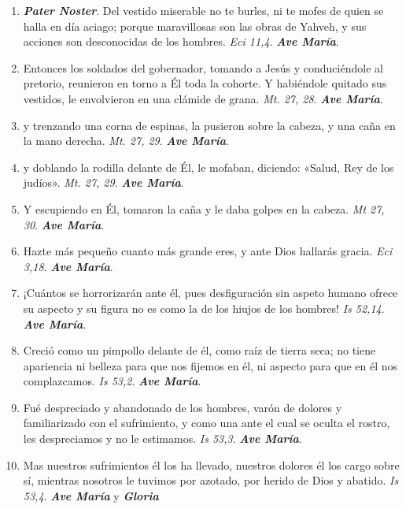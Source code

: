 \documentclass[../../devocionario.tex]{subfiles}
\begin{document}
    \begin{enumerate}
    
        \item \textbf{\textit{Pater Noster}}. Del vestido miserable no te burles, ni te mofes de quien se halla en día aciago; 
            porque maravillosas son las obras de Yahveh, y sus acciones son desconocidas de los hombres. \textit{Eci 11,4}. \textbf{\textit{Ave María}}.

        \item Entonces los soldados del gobernador, tomando a Jesús y conduciéndole al pretorio, reunieron en torno a Él toda la cohorte. 
            Y habiéndole quitado sus vestidos, le envolvieron en una clámide de grana. \textit{Mt. 27, 28}. \textbf{\textit{Ave María}}.

        \item y trenzando una corna de espinas, la pusieron sobre la cabeza, y una caña en la mano derecha. \textit{Mt. 27, 29}. \textbf{\textit{Ave María}}.

        \item y doblando la rodilla delante de Él, le mofaban, diciendo: «Salud, Rey de los judíos». \textit{Mt. 27, 29}. \textbf{\textit{Ave María}}.

        \item Y escupiendo en Él, tomaron la caña y le daba golpes en la cabeza. \textit{Mt 27, 30}. \textbf{\textit{Ave María}}.

        \item Hazte más pequeño cuanto más grande eres, y ante Dios hallarás gracia. \textit{Eci 3,18}. \textbf{\textit{Ave María}}.

        \item ¡Cuántos se horrorizarán ante él, pues desfiguración sin aspeto humano ofrece su aspecto y su figura 
            no es como la de los hiujos de los hombres! \textit{Is 52,14}. \textbf{\textit{Ave María}}.

        \item Creció como un pimpollo delante de él, como raíz de tierra seca; no tiene apariencia ni belleza para 
            que nos fijemos en él, ni aspecto para que en él nos complazcamos. \textit{Is 53,2}. \textbf{\textit{Ave María}}.

        \item Fué despreciado y abandonado de los hombres, varón de dolores y familiarizado con el sufrimiento, 
            y como una ante el cual se oculta el rostro, les despreciamos y no le estimamos. \textit{Is 53,3}. \textbf{\textit{Ave María}}.

        \item Mas nuestros sufrimientos él los ha llevado, nuestros dolores él los cargo sobre sí, 
            mientras nosotros le tuvimos por azotado, por herido de Dios y abatido. \textit{Is 53,4}. \textbf{\textit{Ave María}} y \textbf{\textit{Gloria}}

    \end{enumerate}
\end{document}
